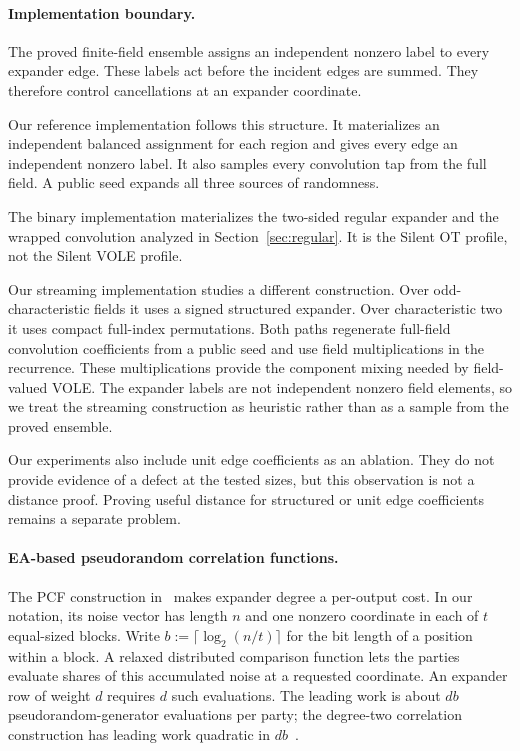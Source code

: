 \paragraph{Implementation boundary.}
The proved finite-field ensemble assigns an independent nonzero label to every
expander edge.  These labels act before the incident edges are summed.  They
therefore control cancellations at an expander coordinate.

Our reference implementation follows this structure.  It materializes an
independent balanced assignment for each region and gives every edge an
independent nonzero label.  It also samples every convolution tap from the
full field.  A public seed expands all three sources of randomness.

The binary implementation materializes the two-sided regular expander and
the wrapped convolution analyzed in Section~\ref{sec:regular}.  It is the
Silent OT profile, not the Silent VOLE profile.

Our streaming implementation studies a different construction.  Over
odd-characteristic fields it uses a signed structured expander.  Over
characteristic two it uses compact full-index permutations.  Both paths
regenerate full-field convolution coefficients from a public seed and use
field multiplications in the recurrence.  These multiplications provide the
component mixing needed by field-valued VOLE.  The expander labels are not
independent nonzero field elements, so we treat the streaming construction as
heuristic rather than as a sample from the proved ensemble.

Our experiments also include unit edge coefficients as an ablation.  They do
not provide evidence of a defect at the tested sizes, but this observation is
not a distance proof.  Proving useful distance for structured or unit edge
coefficients remains a separate problem.

\paragraph{EA-based pseudorandom correlation functions.}
\label{sec:pcf-impact}
The PCF construction in~\cite[Section~5.2]{EA} makes expander degree a
per-output cost.  In our notation, its noise vector has length $n$
and one nonzero coordinate in each of $t$ equal-sized blocks.
Write $b:=\lceil\log_2(n/t)\rceil$ for the bit length of a position within
a block.  A relaxed distributed comparison function lets the parties
evaluate shares of this accumulated noise at a requested coordinate.
An expander row of weight $d$ requires $d$ such evaluations.
The leading work is about $db$ pseudorandom-generator evaluations per
party; the degree-two correlation construction has leading work quadratic
in $db$~\cite[Section~5.4]{EA}.

